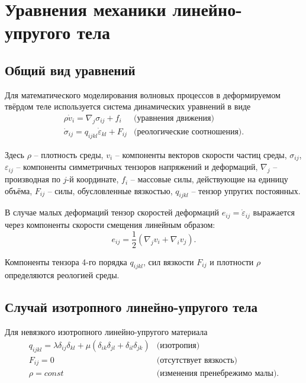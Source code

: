 \section{Уравнения механики линейно-упругого тела}

\subsection{Общий вид уравнений}
\label{model}

Для математического моделирования волновых процессов в деформируемом твёрдом
теле используется система динамических уравнений \cite{sedov, kukudzhanov} в виде
\begin{eqnarray}
	\label{initial_equations}
	\rho\dot{v}_i=\nabla_j\sigma_{ij}+f_i & \textrm{(уравнения движения)}\nonumber\\
	\dot{\sigma}_{ij}=q_{ijkl}\dot{\varepsilon}_{kl}+F_{ij} & \textrm{(реологические соотношения).}
\end{eqnarray}

Здесь $\rho$ – плотность среды, $v_i$ – компоненты векторов скорости частиц среды,
$\sigma_{ij}$, $\varepsilon_{ij}$ -- компоненты симметричных тензоров напряжений и деформаций,
$\nabla_j$ – производная по $j$-й координате, $f_i$ – массовые
силы, действующие на единицу объёма, $F_{ij}$ -- силы, обусловленные вязкостью, $q_{ijkl}$ -- 
тензор упругих постоянных.

В случае малых деформаций тензор скоростей деформаций $e_{ij}=\dot{\varepsilon}_{ij}$ 
выражается через компоненты скорости смещения линейным образом:
\begin{equation}
	e_{ij}=\frac{1}{2}(\nabla_j v_i+\nabla_i v_j).
\end{equation}

Компоненты тензора 4-го порядка $q_{ijkl}$, сил вязкости $F_{ij}$ и плотности $\rho$ определяются реологией среды. 

\subsection{Случай изотропного линейно-упругого тела}
Для невязкого изотропного линейно-упругого материала
\begin{eqnarray}
	\label{isotropic_tensor}
	q_{ijkl}=\lambda\delta_{ij}\delta_{kl}+\mu(\delta_{ik}\delta_{jl}+\delta_{il}
	\delta_{jk}) & \textrm {(изотропия)} \nonumber\\
	F_{ij}=0 & \textrm {(отсутствует вязкость)} \\
	\rho=const & \textrm {(изменения пренебрежимо малы)}.
\end{eqnarray}


